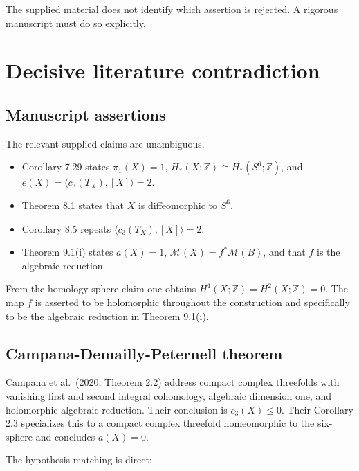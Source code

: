\documentclass[
  10pt,
]{article}
\providecommand{\tightlist}{%
  \setlength{\itemsep}{0pt}\setlength{\parskip}{0pt}}
\begin{document}
The supplied material does not identify which assertion is rejected. A
rigorous manuscript must do so explicitly.

\section{Decisive literature
contradiction}\label{decisive-literature-contradiction}

\subsection{Manuscript assertions}\label{manuscript-assertions}

The relevant supplied claims are unambiguous.

\begin{itemize}
\tightlist
\item
  Corollary 7.29 states \(\pi_1(X)=1\),
  \(H_*(X;\mathbb Z)\cong H_*(S^6;\mathbb Z)\), and
  \(e(X)=\langle c_3(T_X),[X]\rangle=2\).
\item
  Theorem 8.1 states that \(X\) is diffeomorphic to \(S^6\).
\item
  Corollary 8.5 repeats \(\langle c_3(T_X),[X]\rangle=2\).
\item
  Theorem 9.1(i) states \(a(X)=1\), \(\mathcal M(X)=f^*\mathcal M(B)\),
  and that \(f\) is the algebraic reduction.
\end{itemize}

From the homology-sphere claim one obtains
\(H^1(X;\mathbb Z)=H^2(X;\mathbb Z)=0\). The map \(f\) is asserted to be
holomorphic throughout the construction and specifically to be the
algebraic reduction in Theorem 9.1(i).

\subsection{Campana-Demailly-Peternell
theorem}\label{campana-demailly-peternell-theorem}

Campana et al.~(2020, Theorem 2.2) address compact complex threefolds
with vanishing first and second integral cohomology, algebraic dimension
one, and holomorphic algebraic reduction. Their conclusion is
\(c_3(X)\le 0\). Their Corollary 2.3 specializes this to a compact
complex threefold homeomorphic to the six-sphere and concludes
\(a(X)=0\).

The hypothesis matching is direct:
\end{document}

